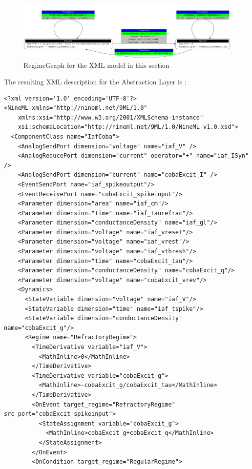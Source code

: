 \documentclass[draftspec]{ninemlspec}
\begin{document}
\begin{figure}[htb!]
\center
\includegraphics[width=14cm]{figures/demo2_Coba1_trnasition.pdf}
\protect\caption{RegimeGraph for the XML model in this section}
\label{fig:EX2_trans}
\end{figure}
\clearpage
The resulting XML description for the Abstraction Layer is :
\begin{lstlisting}[style=XML]
<?xml version='1.0' encoding='UTF-8'?>
<NineML xmlns="http://nineml.net/9ML/1.0"
    xmlns:xsi="http://www.w3.org/2001/XMLSchema-instance"
    xsi:schemaLocation="http://nineml.net/9ML/1.0/NineML_v1.0.xsd">
  <ComponentClass name="IafCoba">
    <AnalogSendPort dimension="voltage" name="iaf_V" />
    <AnalogReducePort dimension="current" operator="+" name="iaf_ISyn" />
    <AnalogSendPort dimension="current" name="cobaExcit_I" />
    <EventSendPort name="iaf_spikeoutput"/>
    <EventReceivePort name="cobaExcit_spikeinput"/>
    <Parameter dimension="area" name="iaf_cm"/>
    <Parameter dimension="time" name="iaf_taurefrac"/>
    <Parameter dimension="conductanceDensity" name="iaf_gl"/>
    <Parameter dimension="voltage" name="iaf_vreset"/>
    <Parameter dimension="voltage" name="iaf_vrest"/>
    <Parameter dimension="voltage" name="iaf_vthresh"/>
    <Parameter dimension="time" name="cobaExcit_tau"/>
    <Parameter dimension="conductanceDensity" name="cobaExcit_q"/>
    <Parameter dimension="voltage" name="cobaExcit_vrev"/>
    <Dynamics>
      <StateVariable dimension="voltage" name="iaf_V"/>
      <StateVariable dimension="time" name="iaf_tspike"/>
      <StateVariable dimension="conductanceDensity" name="cobaExcit_g"/>
      <Regime name="RefractoryRegime">
        <TimeDerivative variable="iaf_V">
          <MathInline>0</MathInline>
        </TimeDerivative>
        <TimeDerivative variable="cobaExcit_g">
          <MathInline>-cobaExcit_g/cobaExcit_tau</MathInline>
        </TimeDerivative>
        <OnEvent target_regime="RefractoryRegime" src_port="cobaExcit_spikeinput">
          <StateAssignment variable="cobaExcit_g">
            <MathInline>cobaExcit_g+cobaExcit_q</MathInline>
          </StateAssignment>
        </OnEvent>
        <OnCondition target_regime="RegularRegime">

\end{lstlisting}
\end{document}
